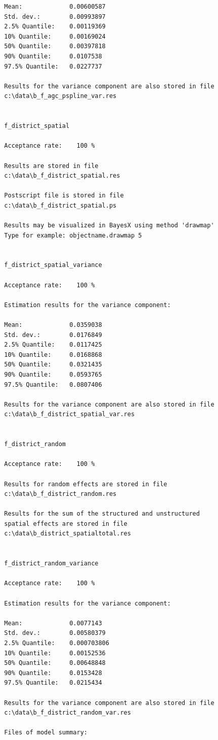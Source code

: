 \documentclass[11pt,a4paper,twoside]{bayesxreport}
\begin{document}
\begin{verbatim}
  Mean:             0.00600587
  Std. dev.:        0.00993897
  2.5% Quantile:    0.00119369
  10% Quantile:     0.00169024
  50% Quantile:     0.00397818
  90% Quantile:     0.0107538
  97.5% Quantile:   0.0227737

  Results for the variance component are also stored in file
  c:\data\b_f_agc_pspline_var.res


  f_district_spatial

  Acceptance rate:    100 %

  Results are stored in file
  c:\data\b_f_district_spatial.res

  Postscript file is stored in file
  c:\data\b_f_district_spatial.ps

  Results may be visualized in BayesX using method 'drawmap'
  Type for example: objectname.drawmap 5


  f_district_spatial_variance

  Acceptance rate:    100 %

  Estimation results for the variance component:

  Mean:             0.0359038
  Std. dev.:        0.0176849
  2.5% Quantile:    0.0117425
  10% Quantile:     0.0168868
  50% Quantile:     0.0321435
  90% Quantile:     0.0593765
  97.5% Quantile:   0.0807406

  Results for the variance component are also stored in file
  c:\data\b_f_district_spatial_var.res


  f_district_random

  Acceptance rate:    100 %

  Results for random effects are stored in file
  c:\data\b_f_district_random.res

  Results for the sum of the structured and unstructured
  spatial effects are stored in file
  c:\data\b_district_spatialtotal.res


  f_district_random_variance

  Acceptance rate:    100 %

  Estimation results for the variance component:

  Mean:             0.0077143
  Std. dev.:        0.00580379
  2.5% Quantile:    0.000703806
  10% Quantile:     0.00152536
  50% Quantile:     0.00648848
  90% Quantile:     0.0153428
  97.5% Quantile:   0.0215434

  Results for the variance component are also stored in file
  c:\data\b_f_district_random_var.res

  Files of model summary:


\end{verbatim}
\end{document}
